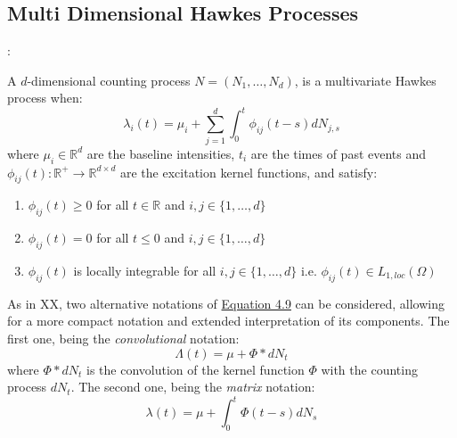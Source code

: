 \documentclass[12pt,a4paper]{cau_thesis}
\begin{document}
\subsection{Multi Dimensional Hawkes Processes}\label{sub_sec:multi_dimensional_hawkes_processes}
\cite[See ][,p.5]{oxford_hawkes_2020}:

\begin{definition}\label{def:multivariate_hawkes_process}
    A $d$-dimensional counting process $N = (N_1, \ldots, N_d)$, is a
    multivariate Hawkes process when:
    \begin{equation}\label{eq:multivariate_hawkes_intensity}
        \lambda_{i}(t) = \mu_{i} + \sum_{j = 1}^{d} \int_{0}^{t} \phi_{ij}(t - s) dN_{j, s}
    \end{equation}
    where $\mu_{i} \in \mathbb{R}^d$ are the baseline intensities, $t_i$ are the times of past events and
    $\phi_{ij}(t): \mathbb{R}^+ \to \mathbb{R}^{d \times d}$ are the excitation kernel functions,
    and satisfy:
    \begin{enumerate}
        \item $\phi_{ij}(t) \geq 0$ for all $t \in \mathbb{R}$ and $i, j \in \{1, \ldots, d\}$
        \item $\phi_{ij}(t) = 0$ for all $t \leq 0$ and $i, j \in \{1, \ldots, d\}$
        \item $\phi_{ij}(t)$ is locally integrable for all $i, j \in \{1, \ldots, d\}$ i.e. $\phi_{ij}(t) \in L_{1, loc}(\Omega)$
    \end{enumerate}
\end{definition}

As in XX, two alternative notations of
\hyperref[eq:multivariate_hawkes_intensity]{Equation 4.9} can be
considered, allowing for a more compact notation and extended
interpretation of its components. The first one, being the
\emph{convolutional} notation:
\begin{equation}
    \Lambda(t) = \mu + \Phi * dN_t
\end{equation}
where $\Phi * dN_t$ is the convolution of the kernel function $\Phi$ with the counting process $dN_t$.
The second one, being the \emph{matrix} notation:
\begin{equation}
    \lambda(t) = \mu + \int_{0}^{t} \Phi(t - s) dN_{s}
\end{equation}
\end{document}
